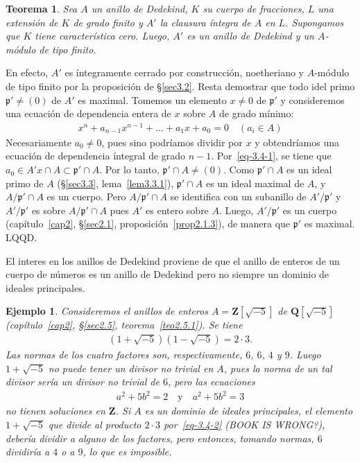 \documentclass[bibtotoc,leqno,spanish]{amsbook}
\let\emph\relax %
\newcommand{\QQ}{\mathbf{Q}}
\newcommand{\ZZ}{\mathbf{Z}}
\newcommand{\idl}[1]{\mathfrak{#1}}
\newcommand{\QED}{LQQD.}
\numberwithin{equation}{section}
\theoremstyle{note}
\theoremstyle{note}
\newtheorem{theorem}{Teorema}
\theoremstyle{rem}
\newtheorem*{example*}{Ejemplo}
\numberwithin{theorem}{section}
\numberwithin{proposition}{section}
\numberwithin{definition}{section}
\numberwithin{lemma}{section}
\numberwithin{corollary}{section}
\numberwithin{example}{section}
\numberwithin{footnote}{section}%
\begin{document}
\begin{theorem}\label{teo3.4.1}
Sea $A$ un anillo de Dedekind, $K$ su cuerpo de fracciones, $L$ una extensi\'on de $K$ de grado finito y
$A'$ la clausura \'integra de $A$ en $L$. Supongamos que $K$ tiene caracter\'istica cero. Luego,
$A'$ es un anillo de Dedekind y un $A$-m\'odulo de tipo finito.
\end{theorem}

En efecto, $A'$ es \'integramente cerrado por construcci\'on, noetheriano y $A$-m\'odulo de tipo finito
por la proposici\'on de \S\ref{sec3.2}. Resta demostrar que todo idel primo $\idl{p}'\neq(0)$ de $A'$ es maximal. Tomemos
un elemento $x\neq 0$ de $\idl{p}'$ y consideremos una ecuaci\'on de dependencia entera de $x$ sobre $A$ de
grado m\'inimo:
\begin{gather}\label{eq-3.4-1}
x^{n}+a_{n-1}x^{n-1}+\dots+a_{1}x+a_{0} = 0\quad(a_{i}\in A)
\end{gather}
Necesariamente $a_{0}\neq 0$, pues sino podr\'iamos dividir por $x$ y obtendr\'iamos una ecuaci\'on de dependencia
\'integral de grado $n-1$. Por~\eqref{eq-3.4-1}, se tiene que $a_{0}\in A'x\cap A\subset\idl{p}'\cap A$. Por lo tanto,
$\idl{p}'\cap A\neq(0)$. Como $\idl{p}'\cap A$ es un ideal primo de $A$ (\S\ref{sec3.3}, lema~\ref{lem3.3.1}), $\idl{p}'\cap A$
es un ideal maximal de $A$, y $A/\idl{p'}\cap A$ es un cuerpo. Pero $A/\idl{p}'\cap A$ se identifica con un
subanillo de $A'/\idl{p}'$ y $A'/\idl{p'}$ es \emph{entero} sobre $A/\idl{p}'\cap A$ pues $A'$ es entero
sobre $A$. Luego, $A'/\idl{p}'$ es un cuerpo (cap\'itulo~\ref{cap2}, \S\ref{sec2.1}, proposici\'on~\ref{prop2.1.3}), de manera que $\idl{p}'$
es maximal. \QED

El interes en los anillos de Dedekind proviene de que el anillo de enteros de un cuerpo de n\'umeros es un
anillo de Dedekind pero no siempre un dominio de ideales principales.

\begin{example*}
Consideremos el anillos de enteros $A = \ZZ[\sqrt{-5}]$ de $\QQ[\sqrt{-5}]$
(cap\'itulo~\ref{cap2}, \S\ref{sec2.5}, teorema~\ref{teo2.5.1}). Se tiene
\begin{gather}\label{eq-3.4-2}
(1+\sqrt{-5})(1-\sqrt{-5}) = 2\cdot 3.
\end{gather}
Las normas de los cuatro factores son, respectivamente, $6$, $6$, $4$ y $9$. Luego
$1+\sqrt{-5}$ no puede tener un divisor no trivial en $A$, pues la norma de un tal divisor
ser\'ia un divisor no trivial de $6$, pero las ecuaciones
\begin{gather*}
a^{2}+5b^{2}=2\quad\text{y}\quad a^{2}+5b^{2}=3
\end{gather*}
no tienen soluciones en $\ZZ$. Si $A$ es un dominio de ideales principales, el elemento $1+\sqrt{-5}$
que divide al producto $2\cdot 3$ por~\eqref{eq-3.4-2} (BOOK IS WRONG?), deber\'ia dividir a alguno de los factores, pero entonces,
tomando normas, $6$ dividir\'ia a $4$ o a $9$, lo que es imposible.
\end{example*}
\end{document}
